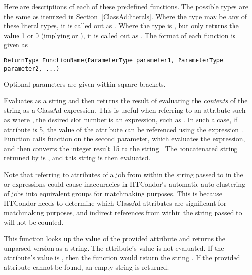 Here are descriptions of each of these predefined functions.
The possible types are the same as itemized
in Section~\ref{ClassAd:literals}.
Where the type may be any of these literal types, it is
called out as \verb@AnyType@.
Where the type is \verb@Integer@, but only returns
the value 1 or 0 (implying  or ),
it is called out as \verb@Boolean@.
The format of each function is given as

\footnotesize
\begin{verbatim}
ReturnType FunctionName(ParameterType parameter1, ParameterType parameter2, ...)
\end{verbatim}
\normalsize
Optional parameters are given within square brackets.

\begin{description}
  \item[\Code{AnyType eval(AnyType Expr)}]
  Evaluates  as a string and then returns the result of
  evaluating the \emph{contents} of the string as a ClassAd expression.
  This is useful when referring to an attribute such as 
  where , the desired slot number is an expression, such as
  .  
  In such a case, if attribute  is 5,
  the value of the attribute  can
  be referenced using the expression
  .
  Function  calls function 
  on the second parameter, which evaluates the expression,
  and then converts the integer result 15 to the string .
  The concatenated string returned by  is
  , and this string is then evaluated.

  Note that referring to attributes of a job from within the string
  passed to  in the  or
   expressions could cause inaccuracies in HTCondor's
  automatic auto-clustering of jobs into equivalent groups for
  matchmaking purposes.  This is because HTCondor needs to determine
  which ClassAd attributes are significant for matchmaking purposes,
  and indirect references from within the string passed to 
  will not be counted.

  \item[\Code{String unparse(Attribute attr)}]
  This function looks up the value of the provided attribute and returns
  the unparsed version as a string. The attribute's value is not evaluated.
  If the attribute's value is , then the function would return
  the string .
  If the provided attribute cannot be found, an empty string is returned.


\end{description}
